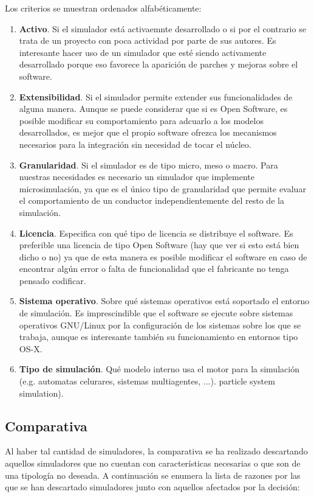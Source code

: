 Los criterios se muestran ordenados alfabéticamente:

\begin{enumerate}
	\item \textbf{Activo}. Si el simulador está activaemnte desarrollado o si por el contrario se trata de un proyecto con poca actividad por parte de sus autores. Es interesante hacer uso de un simulador que esté siendo activamente desarrollado porque eso favorece la aparición de parches y mejoras sobre el software.
	\item \textbf{Extensibilidad}. Si el simulador permite extender sus funcionalidades de alguna manera. Aunque se puede considerar que si es Open Software, es posible modificar su comportamiento para adcuarlo a los modelos desarrollados, es mejor que el propio software ofrezca los mecanismos necesarios para la integración sin necesidad de tocar el núcleo.
	\item \textbf{Granularidad}. Si el simulador es de tipo micro, meso o macro. Para nuestras necesidades es necesario un simulador que implemente microsimulación, ya que es el único tipo de granularidad que permite evaluar el comportamiento de un conductor independientemente del resto de la simulación.
	\item \textbf{Licencia}. Especifica con qué tipo de licencia se distribuye el software. Es preferible una licencia de tipo Open Software (\TODO hay que ver si esto está bien dicho o no) ya que de esta manera es posible modificar el software en caso de encontrar algún error o falta de funcionalidad que el fabricante no tenga pensado codificar.
	\item \textbf{Sistema operativo}. Sobre qué sistemas operativos está soportado el entorno de simulación. Es imprescindible que el software se ejecute sobre sistemas operativos GNU/Linux por la configuración de los sistemas sobre los que se trabaja, aunque es interesante también su funcionamiento en entornos tipo OS-X.
	\item \textbf{Tipo de simulación}. Qué modelo interno usa el motor para la simulación (e.g. automatas celurares, sistemas multiagentes, ...).
	particle system simulation).
\end{enumerate}

\subsection{Comparativa}

Al haber tal cantidad de simuladores, la comparativa se ha realizado descartando aquellos simuladores que no cuentan con características necesarias o que son de una tipología no deseada. A continuación se enumera la lista de razones por las que se han descartado simuladores junto con aquellos afectados por la decisión:

